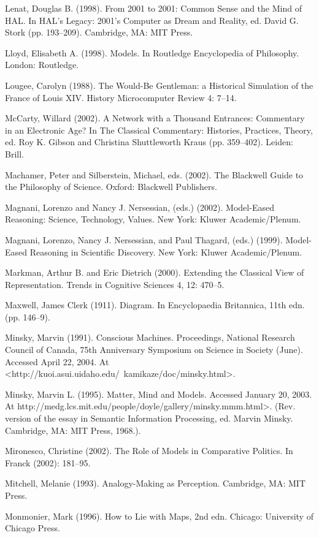 Lenat, Douglas B. (1998). From 2001 to 2001: Common Sense and the Mind of HAL. In HAL's Legacy: 2001's Computer as Dream and Reality, ed. David G. Stork (pp. 193–209). Cambridge, MA: MIT Press.

Lloyd, Elisabeth A. (1998). Models. In Routledge Encyclopedia of Philosophy. London: Routledge.

Lougee, Carolyn (1988). The Would-Be Gentleman: a Historical Simulation of the France of Louis XIV. History Microcomputer Review 4: 7–14.

McCarty, Willard (2002). A Network with a Thousand Entrances: Commentary in an Electronic Age? In The Classical Commentary: Histories, Practices, Theory, ed. Roy K. Gibson and Christina Shuttleworth Kraus (pp. 359–402). Leiden: Brill.

Machamer, Peter and Silberstein, Michael, eds. (2002). The Blackwell Guide to the Philosophy of Science. Oxford: Blackwell Publishers.

Magnani, Lorenzo and Nancy J. Nersessian, (eds.) (2002). Model-Eased Reasoning: Science, Technology, Values. New York: Kluwer Academic/Plenum.

Magnani, Lorenzo, Nancy J. Nersessian, and Paul Thagard, (eds.) (1999). Model-Eased Reasoning in Scientific Discovery. New York: Kluwer Academic/Plenum.

Markman, Arthur B. and Eric Dietrich (2000). Extending the Classical View of Representation. Trends in Cognitive Sciences 4, 12: 470–5.

Maxwell, James Clerk (1911). Diagram. In Encyclopaedia Britannica, 11th edn. (pp. 146–9).

Minsky, Marvin (1991). Conscious Machines. Proceedings, National Research Council of Canada, 75th Anniversary Symposium on Science in Society (June). Accessed April 22, 2004. At <http://kuoi.asui.uidaho.edu/~kamikaze/doc/minsky.html>.

Minsky, Marvin L. (1995). Matter, Mind and Models. Accessed January 20, 2003. At http://medg.lcs.mit.edu/people/doyle/gallery/minsky.mmm.html>. (Rev. version of the essay in Semantic Information Processing, ed. Marvin Minsky. Cambridge, MA: MIT Press, 1968.).

Mironesco, Christine (2002). The Role of Models in Comparative Politics. In Franck (2002): 181–95.

Mitchell, Melanie (1993). Analogy-Making as Perception. Cambridge, MA: MIT Press.

Monmonier, Mark (1996). How to Lie with Maps, 2nd edn. Chicago: University of Chicago Press.


